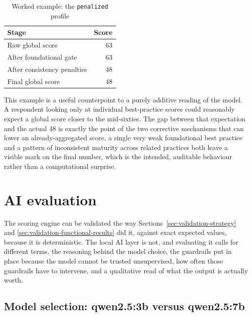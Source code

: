 \begin{table}[htbp]
  \centering
  \begin{tabular}{@{}lr@{}}
    \toprule
    Stage & Score \\
    \midrule
    Raw global score & 63 \\
    After foundational gate & 63 \\
    After consistency penalties & 48 \\
    Final global score & 48 \\
    \bottomrule
  \end{tabular}
  \caption{Worked example: the \texttt{penalized} profile}
  \label{tab:validation-worked-example}
\end{table}

This example is a useful counterpoint to a purely additive reading of the
model. A respondent looking only at individual best-practice scores could
reasonably expect a global score closer to the mid-sixties. The gap between
that expectation and the actual 48 is exactly the point of the two
corrective mechanisms that can lower an already-aggregated score, a single
very weak foundational best practice and a pattern of inconsistent maturity
across related practices both leave a visible mark on the final number,
which is the intended, auditable
behaviour rather than a computational surprise.

\section{AI evaluation}
\label{sec:validation-ai-evaluation}

The scoring engine can be validated the way Sections~\ref{sec:validation-strategy}
and \ref{sec:validation-functional-results} did it, against exact expected
values, because it is deterministic. The local AI layer is not, and
evaluating it calls for different terms, the reasoning behind the model
choice, the guardrails put in place because the model cannot be trusted
unsupervised, how often those guardrails have to intervene, and a
qualitative read of what the output is actually worth.

\subsection{Model selection: qwen2.5:3b versus qwen2.5:7b}
\label{sec:validation-model-selection}

